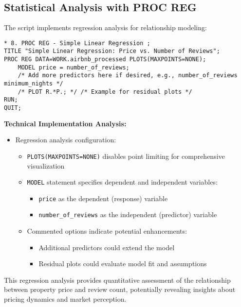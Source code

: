 \documentclass{article}
\begin{document}
\subsection{Statistical Analysis with PROC REG}
The script implements regression analysis for relationship modeling:

\begin{lstlisting}[style=SASStyle, caption=Linear Regression Implementation]
* 8. PROC REG - Simple Linear Regression ;
TITLE "Simple Linear Regression: Price vs. Number of Reviews";
PROC REG DATA=WORK.airbnb_processed PLOTS(MAXPOINTS=NONE);
    MODEL price = number_of_reviews;
    /* Add more predictors here if desired, e.g., number_of_reviews minimum_nights */
    /* PLOT R.*P.; */ /* Example for residual plots */
RUN;
QUIT;
\end{lstlisting}

\noindent
\textbf{Technical Implementation Analysis:}
\begin{itemize}[leftmargin=*]
    \item Regression analysis configuration:
    \begin{itemize}
        \item \texttt{PLOTS(MAXPOINTS=NONE)} disables point limiting for comprehensive visualization
        \item \texttt{MODEL} statement specifies dependent and independent variables:
        \begin{itemize}
            \item \texttt{price} as the dependent (response) variable
            \item \texttt{number\_of\_reviews} as the independent (predictor) variable
        \end{itemize}
        \item Commented options indicate potential enhancements:
        \begin{itemize}
            \item Additional predictors could extend the model
            \item Residual plots could evaluate model fit and assumptions
        \end{itemize}
    \end{itemize}
\end{itemize}

This regression analysis provides quantitative assessment of the relationship between property price and review count, potentially revealing insights about pricing dynamics and market perception.
\end{document}
